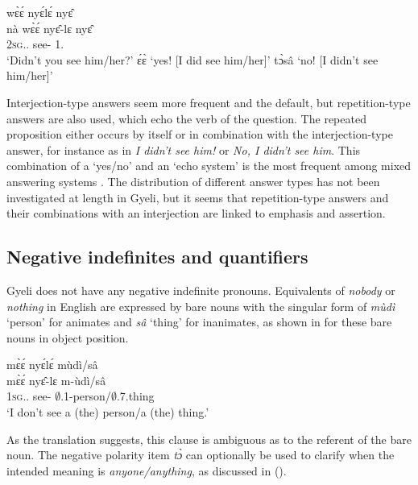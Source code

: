 \documentclass[output=paper,colorlinks=true, citecolor=brown,draftmode]{langscibook}
\begin{document}
\ea\label{Qb}
    \begin{xlist}[A2: ]
         wɛ̀ɛ́ nyɛ́lɛ́ nyɛ̂ \\
              nà wɛ̀ɛ́ nyɛ̂-lɛ nyɛ̂ \\
              {\Q} 2\textsc{sg}.{\PRS}.{\NEG} see-{\NEG} 1.{\OBJ}\\
        \trans `Didn't you see him/her?'
    \label{yesx1}  ɛ́ɛ̀ `yes! [I did see him/her]'
    \label{nox2} tɔ̀sâ `no! [I didn't see him/her]'
    \end{xlist}
\z 


Interjection-type answers seem more frequent and the default, but repetition-type answers are also used, which echo the verb of the question. The repeated proposition either occurs by itself or in combination with the interjection-type answer, for instance as in {\itshape I didn't see him!} or {\itshape No, I didn't see him}. This combination of a `yes/no' and an `echo system' is the most frequent among mixed answering systems \citep{Moser2018}. The distribution of different answer types has not been investigated at length in Gyeli, but it seems that repetition-type answers and their combinations with an interjection are linked to emphasis and assertion. 

\subsection{Negative indefinites and quantifiers}
\label{sec:gye:INDEF}

Gyeli does not have any negative indefinite pronouns. Equivalents of {\itshape nobody} or {\itshape nothing} in English are expressed by bare nouns with the singular form of {\itshape mùdì} `person' for animates and {\itshape sâ} `thing' for inanimates, as shown in  for these bare nouns in object position. 

\ea\label{OBJ}
  \glll   mɛ̀ɛ́ nyɛ́lɛ́ mùdì/sâ \\
         mɛ̀ɛ́ nyɛ̂-lɛ m-ùdì/sâ \\
    1\textsc{sg}.{\PRS}.{\NEG} see-{\NEG} $\emptyset$.1-person/$\emptyset$.7.thing \\
    \trans `I don't see a (the) person/a (the) thing.'
\z    

As the translation suggests, this clause is ambiguous as to the referent of the bare noun. The negative polarity item {\itshape tɔ̀} can optionally be used to clarify when the intended meaning is {\itshape anyone/anything}, as discussed in ().
\end{document}

